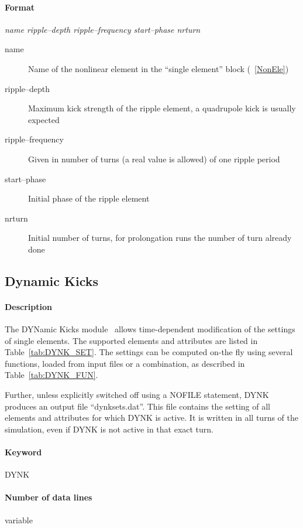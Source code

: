 \paragraph{Format} {\em name ripple--depth ripple--frequency start--phase nrturn}

\begin{description}
\item [name] Name of the nonlinear element in the ``single element''
  block (~\ref{NonEle})
\item [ripple--depth] Maximum kick strength of the ripple element, a
  quadrupole kick is usually expected
\item [ripple--frequency] Given in number of turns (a real value is
  allowed) of one ripple period
\item [start--phase] Initial phase of the ripple element
\item [nrturn] Initial number of turns, for prolongation runs the
  number of turn already done
\end{description}


\subsection{Dynamic Kicks}
\label{sec:DYNK}

\paragraph{Description}
The DYNamic Kicks module~\cite{DYNKpaper} allows time-dependent modification of the settings of single elements.
The supported elements and attributes are listed in Table~\ref{tab:DYNK_SET}.
The settings can be computed on-the fly using several functions, loaded from input files or a combination, as described in Table~\ref{tab:DYNK_FUN}.

Further, unless explicitly switched off using a NOFILE statement, DYNK produces an output file ``dynksets.dat''.
This file contains the setting of all elements and attributes for which DYNK is active.
It is written in all turns of the simulation, even if DYNK is not active in that exact turn.

\paragraph{Keyword} DYNK

\paragraph{Number of data lines} variable

